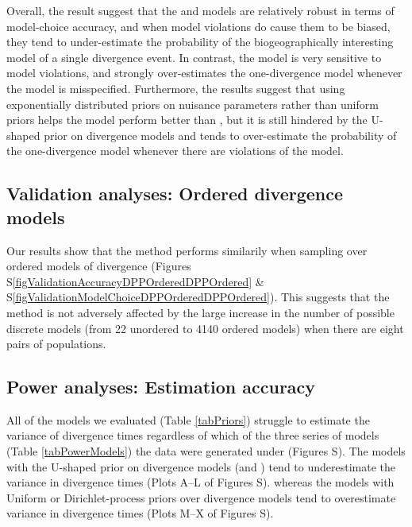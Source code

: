 Overall, the result suggest that the \modelDPP and \modelUniform models are
relatively robust in terms of model-choice accuracy, and when model violations
do cause them to be biased, they tend to under-estimate the probability of the
biogeographically interesting model of a single divergence event.
In contrast, the \modelOld model is very sensitive to model violations, and
strongly over-estimates the one-divergence model whenever the model is
misspecified.
Furthermore, the results suggest that using exponentially distributed priors on
nuisance parameters rather than uniform priors helps the \modelUshaped model
perform better than \modelOld, but it is still hindered by the U-shaped prior
on divergence models and tends to over-estimate the probability of the
one-divergence model whenever there are violations of the model.


\subsection*{Validation analyses: Ordered divergence models}
Our results show that the method performs similarily when sampling over ordered
models of divergence
(Figures S\ref{figValidationAccuracyDPPOrderedDPPOrdered} \&
S\ref{figValidationModelChoiceDPPOrderedDPPOrdered}).
This suggests that the method is not adversely affected by the large increase
in the number of possible discrete models (from 22 unordered to 4140 ordered
models) when there are eight pairs of populations.

\subsection*{Power analyses: Estimation accuracy}
All of the models we evaluated (Table \ref{tabPriors}) struggle to estimate the
variance of divergence times \divTimeDispersion regardless of which of the
three series of models (Table \ref{tabPowerModels}) the data were generated
under
(Figures
S).
The models with the U-shaped prior on divergence models (\modelOld and
\modelUshaped) tend to underestimate the variance in divergence times 
(Plots A--L of Figures
S).
whereas the models with Uniform or Dirichlet-process priors over divergence
models tend to overestimate variance in divergence times
(Plots M--X of Figures
S).


